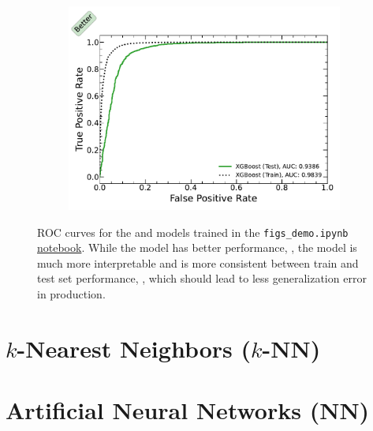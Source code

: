 \begin{figure}[H]
  \begin{subfigure}[b]{0.48\textwidth}\centering
      \includegraphics[width=\textwidth]{figures/ml/figs_demo/roc_xgboost_test_train}
  \caption{\xgboost}
  \label{fig:FIGS:demo_roc:xgboost}
  \end{subfigure}
\caption{
ROC curves for the \figs and \xgboost models trained in the
\texttt{figs\_demo.ipynb} \href{https://github.com/mepland/data_science_notes/blob/main/plots/figs_demo.ipynb}{notebook}.
While the \xgboost model has better performance, ,
the \figs model is much more interpretable and
is more consistent between train and test set performance, ,
which should lead to less generalization error in production.
\label{fig:FIGS:demo_roc}
}
\end{figure}

\section{\texorpdfstring{$k$}{k}-Nearest Neighbors (\texorpdfstring{$k$}{k}-NN)}
\label{class:kNN}

\section{Artificial Neural Networks (NN)}
\label{class:ANN}

